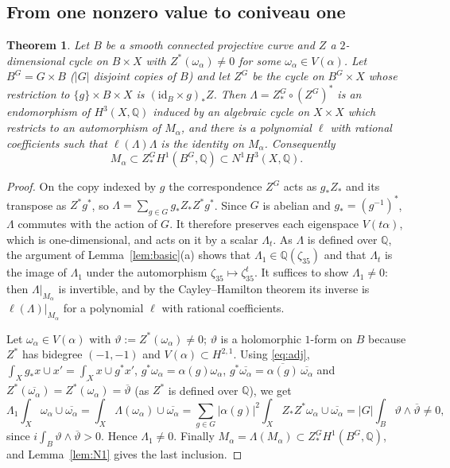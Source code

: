 \documentclass[11pt]{amsart}
\newtheorem{theorem}{Theorem}[section]
\theoremstyle{definition}
\theoremstyle{remark}
\numberwithin{equation}{section}
\newcommand{\Q}{\mathbb{Q}}
\begin{document}
\subsection{From one nonzero value to coniveau one}\label{subsec:coniveau}

\begin{theorem}\label{thm:coniveau}
Let $B$ be a smooth connected projective curve and $Z$ a $2$-dimensional cycle on $B\times X$ with $Z^*(\omega_\alpha)\ne0$ for some $\omega_\alpha\in V(\alpha)$. Let $B^G=G\times B$ ($|G|$ disjoint copies of $B$) and let $Z^G$ be the cycle on $B^G\times X$ whose restriction to $\{g\}\times B\times X$ is $(\mathrm{id}_B\times g)_*Z$. Then $\Lambda=Z^G_*\circ(Z^G)^*$ is an endomorphism of $H^3(X,\Q)$ induced by an algebraic cycle on $X\times X$ which restricts to an automorphism of $M_\alpha$, and there is a polynomial $\ell$ with rational coefficients such that $\ell(\Lambda)\Lambda$ is the identity on $M_\alpha$. Consequently
\[
M_\alpha\subset Z^G_*H^1(B^G,\Q)\subset N^1H^3(X,\Q).
\]
\end{theorem}

\begin{proof}
On the copy indexed by $g$ the correspondence $Z^G$ acts as $g_*Z_*$ and its transpose as $Z^*g^*$, so $\Lambda=\sum_{g\in G}g_*Z_*Z^*g^*$. Since $G$ is abelian and $g_*=(g^{-1})^*$, $\Lambda$ commutes with the action of $G$. It therefore preserves each eigenspace $V(t\alpha)$, which is one-dimensional, and acts on it by a scalar $\Lambda_t$. As $\Lambda$ is defined over $\Q$, the argument of Lemma~\ref{lem:basic}(a) shows that $\Lambda_1\in\Q(\zeta_{35})$ and that $\Lambda_t$ is the image of $\Lambda_1$ under the automorphism $\zeta_{35}\mapsto\zeta_{35}^t$. It suffices to show $\Lambda_1\ne0$: then $\Lambda|_{M_\alpha}$ is invertible, and by the Cayley--Hamilton theorem its inverse is $\ell(\Lambda)|_{M_\alpha}$ for a polynomial $\ell$ with rational coefficients.

Let $\omega_\alpha\in V(\alpha)$ with $\vartheta:=Z^*(\omega_\alpha)\ne0$; $\vartheta$ is a holomorphic $1$-form on $B$ because $Z^*$ has bidegree $(-1,-1)$ and $V(\alpha)\subset H^{2,1}$. Using \eqref{eq:adj}, $\int_Xg_*x\cup x'=\int_Xx\cup g^*x'$, $g^*\omega_\alpha=\alpha(g)\omega_\alpha$, $g^*\overline{\omega_\alpha}=\overline{\alpha(g)}\,\overline{\omega_\alpha}$ and $Z^*(\overline{\omega_\alpha})=\overline{Z^*(\omega_\alpha)}=\overline\vartheta$ (as $Z^*$ is defined over $\Q$), we get
\[
\Lambda_1\int_X\omega_\alpha\cup\overline{\omega_\alpha}=\int_X\Lambda(\omega_\alpha)\cup\overline{\omega_\alpha}=\sum_{g\in G}|\alpha(g)|^2\int_X Z_*Z^*\omega_\alpha\cup\overline{\omega_\alpha}=|G|\int_B\vartheta\wedge\overline{\vartheta}\ne0,
\]
since $i\int_B\vartheta\wedge\overline\vartheta>0$. Hence $\Lambda_1\ne0$. Finally $M_\alpha=\Lambda(M_\alpha)\subset Z^G_*H^1(B^G,\Q)$, and Lemma~\ref{lem:N1} gives the last inclusion.
\end{proof}
\end{document}
